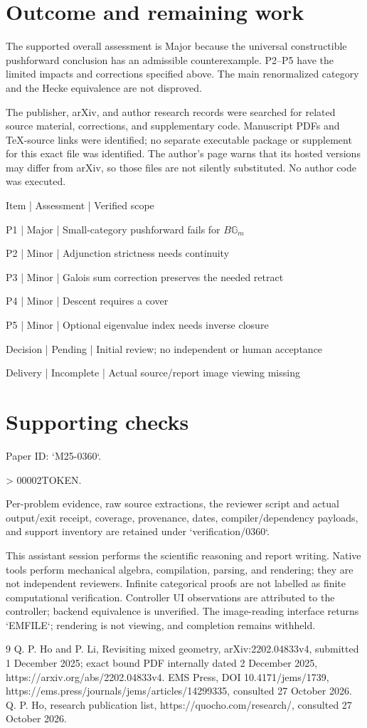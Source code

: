 \documentclass[10pt]{article}
\begin{document}
\section*{Outcome and remaining work}
The supported overall assessment is Major because the universal constructible pushforward conclusion has an admissible counterexample. P2–P5 have the limited impacts and corrections specified above. The main renormalized category and the Hecke equivalence are not disproved.\par
The publisher, arXiv, and author research records were searched for related source material, corrections, and supplementary code. Manuscript PDFs and TeX-source links were identified; no separate executable package or supplement for this exact file was identified. The author’s page warns that its hosted versions may differ from arXiv, so those files are not silently substituted. No author code was executed.\par
Item | Assessment | Verified scope\par
P1 | Major | Small-category pushforward fails for \(B\mathbb G_m\)\par
P2 | Minor | Adjunction strictness needs continuity\par
P3 | Minor | Galois sum correction preserves the needed retract\par
P4 | Minor | Descent requires a cover\par
P5 | Minor | Optional eigenvalue index needs inverse closure\par
Decision | Pending | Initial review; no independent or human acceptance\par
Delivery | Incomplete | Actual source/report image viewing missing\par
\section*{Supporting checks}
Paper ID: `M25-0360`.\par
> 00002TOKEN.\par
Per-problem evidence, raw source extractions, the reviewer script and actual output/exit receipt, coverage, provenance, dates, compiler/dependency payloads, and support inventory are retained under `verification/0360`.\par
This assistant session performs the scientific reasoning and report writing. Native tools perform mechanical algebra, compilation, parsing, and rendering; they are not independent reviewers. Infinite categorical proofs are not labelled as finite computational verification. Controller UI observations are attributed to the controller; backend equivalence is unverified. The image-reading interface returns `EMFILE`; rendering is not viewing, and completion remains withheld.\par
9 Q. P. Ho and P. Li, Revisiting mixed geometry, arXiv:2202.04833v4, submitted 1 December 2025; exact bound PDF internally dated 2 December 2025, https://arxiv.org/abs/2202.04833v4. EMS Press, DOI 10.4171/jems/1739, https://ems.press/journals/jems/articles/14299335, consulted 27 October 2026. Q. P. Ho, research publication list, https://quocho.com/research/, consulted 27 October 2026.\par
\end{document}
